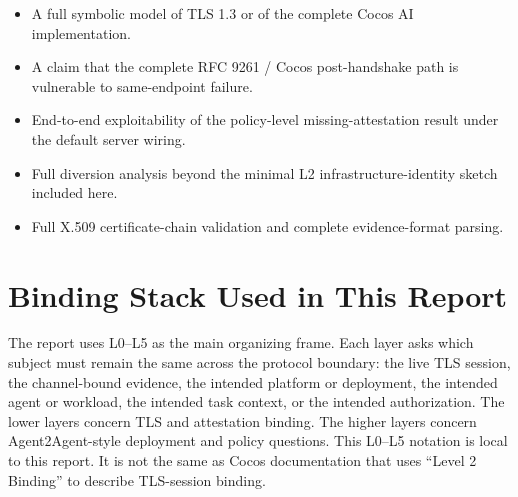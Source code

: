 \documentclass[11pt,a4paper]{article}
\begin{document}
\begin{itemize}
\item A full symbolic model of TLS 1.3 or of the complete Cocos AI
implementation.
\item A claim that the complete RFC 9261 / Cocos post-handshake path is
vulnerable to same-endpoint failure.
\item End-to-end exploitability of the policy-level missing-attestation result
under the default server wiring.
\item Full diversion analysis beyond the minimal L2 infrastructure-identity
sketch included here.
\item Full X.509 certificate-chain validation and complete evidence-format
parsing.
\end{itemize}

\section{Binding Stack Used in This Report}

The report uses L0--L5 as the main organizing frame. Each layer asks which
subject must remain the same across the protocol boundary: the live TLS
session, the channel-bound evidence, the intended platform or deployment, the
intended agent or workload, the intended task context, or the intended
authorization. The lower layers concern TLS and attestation binding. The
higher layers concern Agent2Agent-style deployment and policy questions. This
L0--L5 notation is local to this report. It is not the same as Cocos
documentation that uses ``Level 2 Binding'' to describe TLS-session binding.
\end{document}
